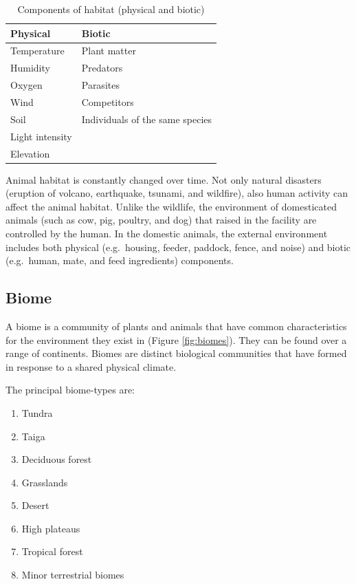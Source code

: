 \documentclass[]{book}
\providecommand{\tightlist}{%
  \setlength{\itemsep}{0pt}\setlength{\parskip}{0pt}}
\begin{document}
\begin{table}[t]

\caption{\label{tab:habitat}Components of habitat (physical and biotic)}
\centering
\begin{tabular}{ll}
\toprule
Physical & Biotic\\
\midrule
Temperature & Plant matter\\
Humidity & Predators\\
Oxygen & Parasites\\
Wind & Competitors\\
Soil & Individuals of the same species\\
\addlinespace
Light intensity & \\
Elevation & \\
\bottomrule
\end{tabular}
\end{table}

Animal habitat is constantly changed over time. Not only natural
disasters (eruption of volcano, earthquake, tsunami, and wildfire), also
human activity can affect the animal habitat. Unlike the wildlife, the
environment of domesticated animals (such as cow, pig, poultry, and dog)
that raised in the facility are controlled by the human. In the domestic
animals, the external environment includes both physical (e.g.~housing,
feeder, paddock, fence, and noise) and biotic (e.g.~human, mate, and
feed ingredients) components.

\subsection{Biome}\label{biome}

A biome is a community of plants and animals that have common
characteristics for the environment they exist in (Figure
\ref{fig:biomes}). They can be found over a range of continents. Biomes
are distinct biological communities that have formed in response to a
shared physical climate.

The principal biome-types are:

\begin{enumerate}
\def\labelenumi{\arabic{enumi}.}
\tightlist
\item
  Tundra
\item
  Taiga
\item
  Deciduous forest
\item
  Grasslands
\item
  Desert
\item
  High plateaus
\item
  Tropical forest
\item
  Minor terrestrial biomes
\end{enumerate}
\end{document}

